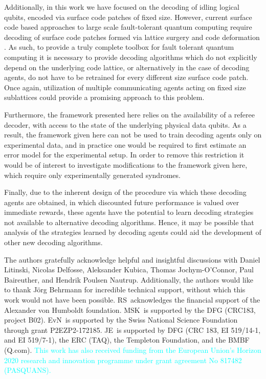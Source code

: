 \documentclass[twocolumn,preprintnumbers,amsmath,amssymb,notitlepage,nofootinbib,longbibliography,superscriptaddress,aps,pra,10pt]{revtex4-1}
\newcommand{\je}[1]{\textcolor{cyan}{#1}}
\begin{document}
	Additionally, in this work we have focused on the decoding of idling logical qubits, encoded via surface code patches of fixed size. 
	However, current surface code based approaches to large scale fault-tolerant quantum computing require decoding of surface code patches formed via lattice surgery and code deformation \cite{Litinski18b,Fowler18}.
	As such, to provide a truly complete toolbox for fault tolerant quantum computing it is necessary to provide decoding algorithms which do not explicitly depend on the underlying code lattice, or alternatively in the case of decoding agents, do not have to be retrained for every different size surface code patch.
	Once again, utilization of multiple communicating agents acting on fixed size sublattices could provide a promising approach to this problem.

	Furthermore, the framework presented here relies on the availability of a referee decoder, with access to the state of the underlying physical data qubits. 
	As a result, the framework given here can not be used to train decoding agents only on experimental data, and in practice one would be required to first estimate an error model for the experimental setup.
	In order to remove this restriction it would be of interest to investigate modifications to the framework given here, which require only experimentally generated syndromes.

	Finally, due to the inherent design of the procedure via which these decoding agents are obtained, in which discounted future performance is valued over immediate rewards, these agents have the potential to learn decoding strategies not available to alternative decoding algorithms.
	Hence, it may be possible that analysis of the strategies learned by decoding agents could aid the development of other new decoding algorithms.
	



	\begin{acknowledgments}
		The authors gratefully acknowledge helpful and insightful discussions with Daniel Litinski, Nicolas Delfosse, Aleksander Kubica, Thomas Jochym-O'Connor, Paul Baireuther, and Hendrik Poulsen Nautrup.
		Additionally, the authors would like to thank J\"{o}rg Behrmann for incredible technical support, without which this work would not have been possible.
		RS\ acknowledges the financial support of the Alexander von Humboldt foundation.
		MSK\ is supported by the DFG (CRC183, project B02).
		EvN\ is supported by the Swiss National Science Foundation through grant P2EZP2-172185.
		JE\ is supported by DFG (CRC 183, EI 519/14-1, and EI 519/7-1), the ERC (TAQ), the Templeton Foundation, and the BMBF (Q.com).
		\je{This work has also received funding from the European Union's Horizon 2020
		research and innovation programme under grant agreement No 817482 (PASQUANS).}
	\end{acknowledgments}
\end{document}
